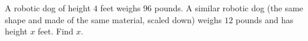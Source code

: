 A robotic dog of height $4$ feet weighs $96$ pounds. A similar robotic dog (the same shape and made of the same material, scaled down) weighs $12$ pounds and has height $x$ feet. Find $x$.
